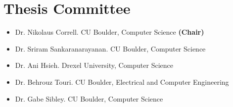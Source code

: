 \documentclass[12pt]{book}
\begin{document}
\section*{Thesis Committee}
\begin{itemize}
\item Dr. Nikolaus Correll. CU Boulder, Computer Science \textbf{(Chair)}
\item Dr. Sriram Sankaranarayanan. CU Boulder, Computer Science
\item Dr. Ani Hsieh. Drexel University, Computer Science
\item Dr. Behrouz Touri. CU Boulder, Electrical and Computer Engineering
\item Dr. Gabe Sibley. CU Boulder, Computer Science
\end{itemize}

\pagestyle{titleStyle}
\end{document}
